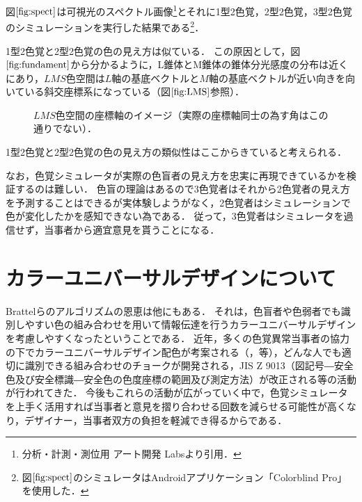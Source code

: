 \documentclass[uplatex,paper=a4,fontsize=4.0truemm,jafontsize=4.0truemm,head_space=30.0truemm,foot_space=30.0truemm,baselineskip=8.0truemm,line_length=40zw,gutter=25.0truemm,oneside,openany,fleqn,hanging_panctuation,open_bracket_pos=nibu_tentsuki,dvipdfmx,jis2004,book,titlepage]{jlreq}
\theoremstyle{mystyle}
\newcommand{\captiondot}[1]{\caption{#1．}}
\newcommand{\mathdisplaystyle}[1]{\(\displaystyle{#1}\)}
\newcommand{\Reference}[1]{\mathdisplaystyle{\ref{#1}}}
\begin{document}
			図\Reference{fig:spect}は可視光のスペクトル画像\footnote{分析・計測・測位用 アート開発 Labs\protect\cite{Artlabs2019}より引用．}とそれに1型2色覚，2型2色覚，3型2色覚のシミュレーションを実行した結果である\footnote{図\protect\Reference{fig:spect}のシミュレータはAndroidアプリケーション「Colorblind Pro」を使用した．}．
			
			1型2色覚と2型2色覚の色の見え方は似ている．
			この原因として，図\Reference{fig:fundament}から分かるように，L錐体とM錐体の錐体分光感度の分布は近くにあり，\mathdisplaystyle{LMS}色空間は\mathdisplaystyle{L}軸の基底ベクトルと\mathdisplaystyle{M}軸の基底ベクトルが近い向きを向いている斜交座標系になっている（図\Reference{fig:LMS}参照）．
			\begin{figure}[tbp]
				\centering
				\captiondot{\protect\mathdisplaystyle{LMS}色空間の座標軸のイメージ（実際の座標軸同士の為す角はこの通りでない）}\label{fig:LMS}
			\end{figure}
			1型2色覚と2型2色覚の色の見え方の類似性はここからきていると考えられる．

			なお，色覚シミュレータが実際の色盲者の見え方を忠実に再現できているかを検証するのは難しい．
			色盲の理論はあるので3色覚者はそれから2色覚者の見え方を予測することはできるが実体験しようがなく，2色覚者はシミュレーションで色が変化したかを感知できない為である．
			従って，3色覚者はシミュレータを過信せず，当事者から適宜意見を貰うことになる．
		\section{カラーユニバーサルデザインについて}
			Brattelらのアルゴリズムの恩恵は他にもある．
			それは，色盲者や色弱者でも識別しやすい色の組み合わせを用いて情報伝達を行うカラーユニバーサルデザインを考慮しやすくなったということである．
			近年，多くの色覚異常当事者の協力の下でカラーユニバーサルデザイン配色が考案される（\cite[pp.~1091--1099]{Okabe2002c}，\cite{cudo2018}等），どんな人でも適切に識別できる組み合わせのチョークが開発される\cite{Rikagaku2020}，JIS Z 9013（図記号―安全色及び安全標識―安全色の色度座標の範囲及び測定方法）が改正される\cite{Nakano2018}等の活動が行われてきた．
			今後もこれらの活動が広がっていく中で，色覚シミュレータを上手く活用すれば当事者と意見を摺り合わせる回数を減らせる可能性が高くなり，デザイナー，当事者双方の負担を軽減でき得るからである．
\end{document}
